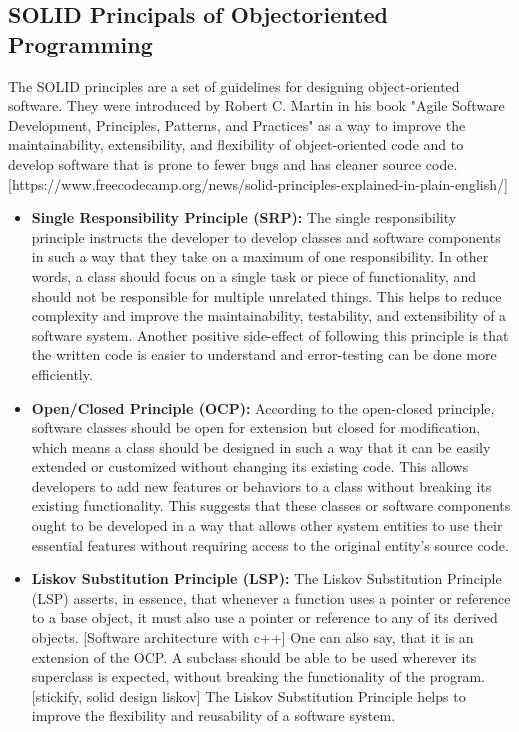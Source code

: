 \subsection{SOLID Principals of Objectoriented Programming}
The SOLID principles are a set of guidelines for designing object-oriented software. They were introduced by Robert C. Martin in his book "Agile Software Development, Principles, Patterns, and Practices" as a way to improve the maintainability, extensibility, and flexibility of object-oriented code and to develop software that is prone to fewer bugs and has cleaner source code. [https://www.freecodecamp.org/news/solid-principles-explained-in-plain-english/]
\begin{itemize}
	\item \textbf{Single Responsibility Principle (SRP):}
	The single responsibility principle instructs the developer to develop classes and software components in such a way that they take on a maximum of one responsibility. In other words, a class should focus on a single task or piece of functionality, and should not be responsible for multiple unrelated things. This helps to reduce complexity and improve the maintainability, testability, and extensibility of a software system. Another positive side-effect of following this principle is that the written code is easier to understand and error-testing can be done more efficiently.
	
	\item \textbf{Open/Closed Principle (OCP):}
	According to the open-closed principle, software classes should be open for extension but closed for modification, which means a class should be designed in such a way that it can be easily extended or customized without changing its existing code. This allows developers to add new features or behaviors to a class without breaking its existing functionality. This suggests that these classes or software components ought to be developed in a way that allows other system entities to use their essential features without requiring access to the original entity's source code. 
	
	\item \textbf{Liskov Substitution Principle (LSP):}
	The Liskov Substitution Principle (LSP) asserts, in essence, that whenever a function uses a pointer or reference to a base object, it must also use a pointer or reference to any of its derived objects. [Software architecture with c++] One can also say, that it is an extension of the OCP. A subclass should be able to be used wherever its superclass is expected, without breaking the functionality of the program. [stickify, solid design liskov] The Liskov Substitution Principle helps to improve the flexibility and reusability of a software system.
	

\end{itemize}

